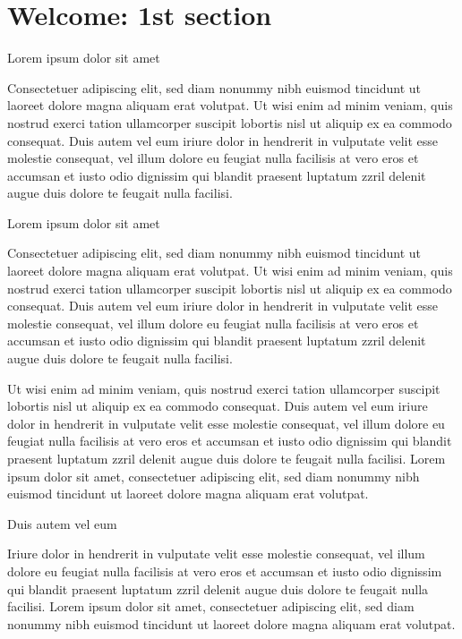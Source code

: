 \documentclass[11pt,twoside]{article}\makeatletter
\makeatletter
\renewcommand\section{\@startsection {section}{1}{\z@}%
     {-1.75ex \@plus -0.5ex \@minus -.2ex}%
     {0.5ex \@plus .2ex}%
     {\reset@font\Large\bfseries\sffamily}}
\def\DivI{\section}
\def\DivI{\chapter}
\makeatother
\begin{document}
\DivI[Welcome: 1st section]{Welcome: 1st section}\label{part1}\par
Lorem ipsum dolor sit amet\par
Consectetuer adipiscing elit, sed diam nonummy nibh euismod       tincidunt ut laoreet dolore magna aliquam erat volutpat. Ut wisi enim       ad minim veniam, quis nostrud exerci tation ullamcorper suscipit       lobortis nisl ut aliquip ex ea commodo consequat. Duis autem vel eum       iriure dolor in hendrerit in vulputate velit esse molestie consequat,       vel illum dolore eu feugiat nulla facilisis at vero eros et accumsan       et iusto odio dignissim qui blandit praesent luptatum zzril delenit       augue duis dolore te feugait nulla facilisi.\par
Lorem ipsum dolor sit amet\par
Consectetuer adipiscing elit, sed diam nonummy nibh euismod       tincidunt ut laoreet dolore magna aliquam erat volutpat. Ut wisi enim       ad minim veniam, quis nostrud exerci tation ullamcorper suscipit       lobortis nisl ut aliquip ex ea commodo consequat. Duis autem vel eum       iriure dolor in hendrerit in vulputate velit esse molestie consequat,       vel illum dolore eu feugiat nulla facilisis at vero eros et accumsan       et iusto odio dignissim qui blandit praesent luptatum zzril delenit       augue duis dolore te feugait nulla facilisi.\par
Ut wisi enim ad minim veniam, quis nostrud exerci tation       ullamcorper suscipit lobortis nisl ut aliquip ex ea commodo       consequat. Duis autem vel eum iriure dolor in hendrerit in vulputate       velit esse molestie consequat, vel illum dolore eu feugiat nulla       facilisis at vero eros et accumsan et iusto odio dignissim qui blandit       praesent luptatum zzril delenit augue duis dolore te feugait nulla       facilisi. Lorem ipsum dolor sit amet, consectetuer adipiscing elit,       sed diam nonummy nibh euismod tincidunt ut laoreet dolore magna       aliquam erat volutpat. \par
Duis autem vel eum \par
Iriure dolor in hendrerit in vulputate velit esse molestie       consequat, vel illum dolore eu feugiat nulla facilisis at vero eros et       accumsan et iusto odio dignissim qui blandit praesent luptatum zzril       delenit augue duis dolore te feugait nulla facilisi. Lorem ipsum dolor       sit amet, consectetuer adipiscing elit, sed diam nonummy nibh euismod       tincidunt ut laoreet dolore magna aliquam erat volutpat. \par
\end{document}
